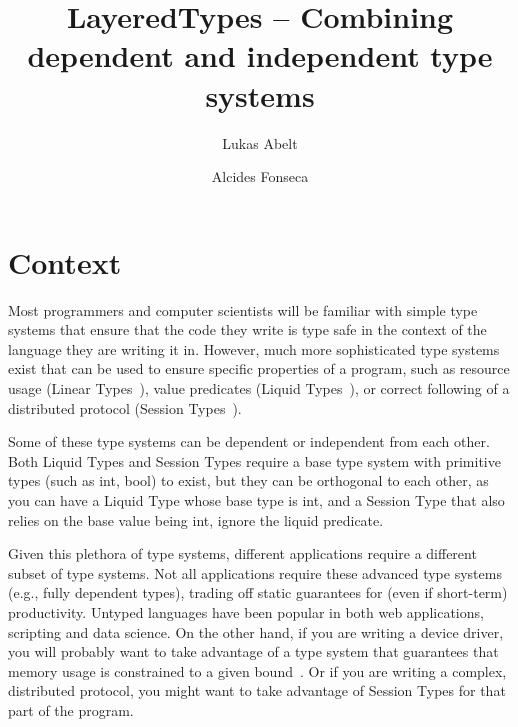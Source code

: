 \documentclass{easychair}
\title{LayeredTypes -- Combining dependent and independent type systems}
\author{
Lukas Abelt\inst{1,2}
\and
Alcides Fonseca\inst{1}
}
\institute{
  LASIGE,
  Faculdade de Ciências da Universidade de Lisboa, Portugal\\
  \email{labelt@lasige.di.fc.ul.pt},
  \email{alcides@ciencias.ulisboa.pt}
\and
   Saarland University,
   Germany\\
}
\begin{document}
\maketitle





%
%

\section{Context}
\label{sec:context}
Most programmers and computer scientists will be familiar with simple type systems that ensure that the code they write is type safe in the context of the language they are writing it in. However, much more sophisticated type systems exist that can be used to ensure specific properties of a program, such as resource usage (Linear Types~\cite{linear}), value predicates (Liquid Types~\cite{DBLP:conf/pldi/RondonKJ08}), or correct following of a distributed protocol (Session Types~\cite{session}).

Some of these type systems can be dependent or independent from each other. Both Liquid Types and Session Types require a base type system with primitive types (such as int, bool) to exist, but they can be orthogonal to each other, as you can have a Liquid Type whose base type is int, and a Session Type that also relies on the base value being int, ignore the liquid predicate.

Given this plethora of type systems, different applications require a different subset of type systems. Not all applications require these advanced type systems (e.g., fully dependent types), trading off static guarantees for (even if short-term) productivity. Untyped languages have been popular in both web applications, scripting and data science. On the other hand, if you are writing a device driver, you will probably want to take advantage of a type system that guarantees that memory usage is constrained to a given bound~\cite{liquidate-assets}. Or if you are writing a complex, distributed protocol, you might want to take advantage of Session Types for that part of the program.
\end{document}
